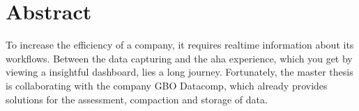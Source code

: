 \chapter*{Abstract}
\label{chap:abstract}

To increase the efficiency of a company, it requires realtime
information about its workflows. Between the data capturing
and the aha experience, which you get by viewing a 
insightful dashboard, lies a long journey. Fortunately,
the master thesis is collaborating with the company GBO Datacomp,
which already provides solutions for the assessment, compaction and
storage of data.
